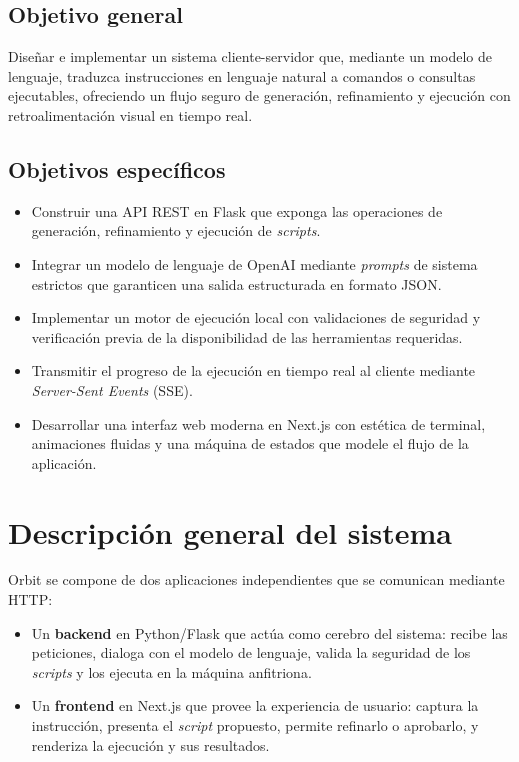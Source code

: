 \documentclass[12pt,a4paper]{article}
\begin{document}
\subsection{Objetivo general}

Diseñar e implementar un sistema cliente-servidor que, mediante un modelo de
lenguaje, traduzca instrucciones en lenguaje natural a comandos o consultas
ejecutables, ofreciendo un flujo seguro de generación, refinamiento y ejecución
con retroalimentación visual en tiempo real.

\subsection{Objetivos específicos}

\begin{itemize}
    \item Construir una API REST en Flask que exponga las operaciones de
    generación, refinamiento y ejecución de \textit{scripts}.
    \item Integrar un modelo de lenguaje de OpenAI mediante \textit{prompts} de
    sistema estrictos que garanticen una salida estructurada en formato JSON.
    \item Implementar un motor de ejecución local con validaciones de seguridad
    y verificación previa de la disponibilidad de las herramientas requeridas.
    \item Transmitir el progreso de la ejecución en tiempo real al cliente
    mediante \textit{Server-Sent Events} (SSE).
    \item Desarrollar una interfaz web moderna en Next.js con estética de
    terminal, animaciones fluidas y una máquina de estados que modele el flujo
    de la aplicación.
\end{itemize}

\section{Descripción general del sistema}

Orbit se compone de dos aplicaciones independientes que se comunican mediante
HTTP:

\begin{itemize}
    \item Un \textbf{backend} en Python/Flask que actúa como cerebro del
    sistema: recibe las peticiones, dialoga con el modelo de lenguaje, valida la
    seguridad de los \textit{scripts} y los ejecuta en la máquina anfitriona.
    \item Un \textbf{frontend} en Next.js que provee la experiencia de usuario:
    captura la instrucción, presenta el \textit{script} propuesto, permite
    refinarlo o aprobarlo, y renderiza la ejecución y sus resultados.
\end{itemize}
\end{document}
